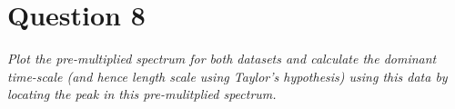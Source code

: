 \section*{Question 8}
\textit{Plot the pre-multiplied spectrum for both datasets and calculate the dominant time-scale (and hence length scale using Taylor’s hypothesis) using this data by locating the peak in this pre-mulitplied spectrum.}
